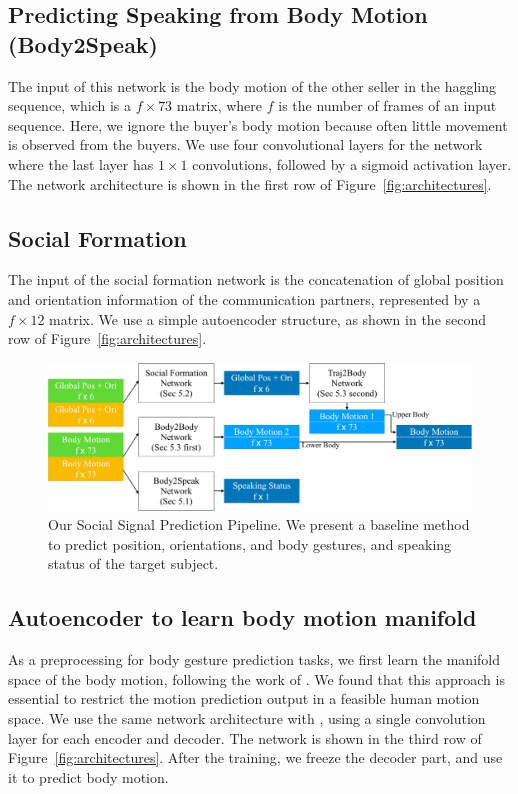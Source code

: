 \subsection{Predicting Speaking from Body Motion (Body2Speak)}
The input of this network is the body motion of the other seller in the haggling sequence, which is a $f \times 73$ matrix, where $f$ is the number of frames of an input sequence. Here, we ignore the buyer's body motion because often little movement is observed from the buyers.  We use four convolutional layers for the network where the last layer has $1\times1$ convolutions, followed by a sigmoid activation layer. The network architecture is shown in the first row of Figure~\ref{fig:architectures}.


\subsection{Social Formation}
The input of the social formation network is the concatenation of global position and orientation information of the communication partners, represented by a $f \times 12$ matrix.  We use a simple autoencoder structure, as shown in the second row of Figure~\ref{fig:architectures}.

\begin{figure}[t]	
	\includegraphics[width=\textwidth]{ssp_fig/ssp_pipeline}
	\caption{Our Social Signal Prediction Pipeline. We present a baseline method to predict position, orientations, and body gestures, and speaking status of the target subject. }
	\label{fig:pipeline}
\end{figure}

\subsection{Autoencoder to learn body motion manifold}
\label{sec:autoencoder}
As a preprocessing for body gesture prediction tasks, we first learn the manifold space of the body motion, following the work of \cite{holden2016deep}. We found that this approach is essential to restrict the motion prediction output in a feasible human motion space. We use the same network architecture with \cite{holden2016deep}, using a single convolution layer for each encoder and decoder. The network is shown in the third row of  Figure~\ref{fig:architectures}. After the training, we freeze the decoder part, and use it to predict body motion. 

